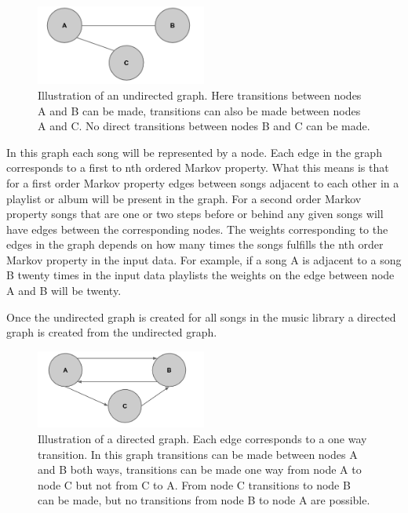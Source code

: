 \documentclass[a4paper,11pt]{kth-mag}
\begin{document}
\begin{figure}
\centering
\includegraphics[width=0.5\textwidth]{images/UGM.png}
\caption{Illustration of an undirected graph. Here transitions between nodes A and B can be made, transitions can also be made between nodes A and C. No direct transitions between nodes B and C can be made.}
\end{figure}

In this graph each song will be represented by a node. Each edge in the graph corresponds to a first to nth ordered Markov property. What this means is that for a first order Markov property edges between songs adjacent to each other in a playlist or album will be present in the graph. For a second order Markov property songs that are one or two steps before or behind any given songs will have edges between the corresponding nodes. The weights corresponding to the edges in the graph depends on how many times the songs fulfills the nth order Markov property in the input data. For example, if a song A is adjacent to a song B twenty times in the input data playlists the weights on the edge between node A and B will be twenty.

  Once the undirected graph is created for all songs in the music library a directed graph is created from the undirected graph.
  
\begin{figure}
\centering
\includegraphics[width=0.5\textwidth]{images/DGM.png}
\caption{Illustration of a directed graph. Each edge corresponds to a one way transition. In this graph transitions can be made between nodes A and B both ways, transitions can be made one way from node A to node C but not from C to A. From node C transitions to node B can be made, but no transitions from node B to node A are possible.}
\end{figure}  
  
\end{document}
